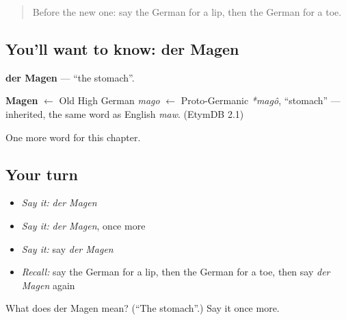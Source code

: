 \begin{quote}
Before the new one: say the German for a lip, then the German for a toe.
\end{quote}

\subsection*{You'll want to know: der Magen}
\textbf{der Magen} — \textquotedblleft{}the stomach\textquotedblright{}.

\begin{cousinweb}
\textbf{Magen} $\leftarrow$ Old High German \emph{mago} $\leftarrow$ Proto-Germanic \emph{*magô}, \textquotedblleft{}stomach\textquotedblright{} — inherited, the same word as English \emph{maw}. (EtymDB 2.1)
\end{cousinweb}

\begin{grammarlens}[title={What you've built}]
One more word for this chapter.
\end{grammarlens}

\subsection*{Your turn}
\begin{itemize}
\raggedright
  \item \emph{Say it:} \emph{der Magen}
  \item \emph{Say it:} \emph{der Magen}, once more
  \item \emph{Say it:} say \emph{der Magen}
  \item \emph{Recall:} say the German for a lip, then the German for a toe, then say \emph{der Magen} again
\end{itemize}

\begin{tcolorbox}[breakable,colback=teal!4,colframe=teal!35!black,title={Before you move on}]
What does der Magen mean? (\textquotedblleft{}The stomach\textquotedblright{}.) Say it once more.
\end{tcolorbox}
